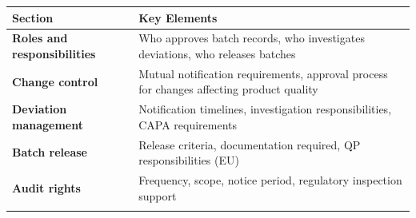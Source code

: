 \documentclass[
  11pt,
  a4paper,
]{report}
\begin{document}
\begin{longtable}[]{@{}ll@{}}
\toprule
\begin{minipage}[b]{0.38\columnwidth}\raggedright
Section\strut
\end{minipage} & \begin{minipage}[b]{0.56\columnwidth}\raggedright
Key Elements\strut
\end{minipage}\tabularnewline
\midrule
\endhead
\begin{minipage}[t]{0.38\columnwidth}\raggedright
\textbf{Roles and responsibilities}\strut
\end{minipage} & \begin{minipage}[t]{0.56\columnwidth}\raggedright
Who approves batch records, who investigates deviations, who releases
batches\strut
\end{minipage}\tabularnewline
\begin{minipage}[t]{0.38\columnwidth}\raggedright
\textbf{Change control}\strut
\end{minipage} & \begin{minipage}[t]{0.56\columnwidth}\raggedright
Mutual notification requirements, approval process for changes affecting
product quality\strut
\end{minipage}\tabularnewline
\begin{minipage}[t]{0.38\columnwidth}\raggedright
\textbf{Deviation management}\strut
\end{minipage} & \begin{minipage}[t]{0.56\columnwidth}\raggedright
Notification timelines, investigation responsibilities, CAPA
requirements\strut
\end{minipage}\tabularnewline
\begin{minipage}[t]{0.38\columnwidth}\raggedright
\textbf{Batch release}\strut
\end{minipage} & \begin{minipage}[t]{0.56\columnwidth}\raggedright
Release criteria, documentation required, QP responsibilities (EU)\strut
\end{minipage}\tabularnewline
\begin{minipage}[t]{0.38\columnwidth}\raggedright
\textbf{Audit rights}\strut
\end{minipage} & \begin{minipage}[t]{0.56\columnwidth}\raggedright
Frequency, scope, notice period, regulatory inspection support\strut
\end{minipage}\tabularnewline
\begin{minipage}[t]{0.38\columnwidth}\raggedright

\end{minipage}
\end{longtable}
\end{document}
